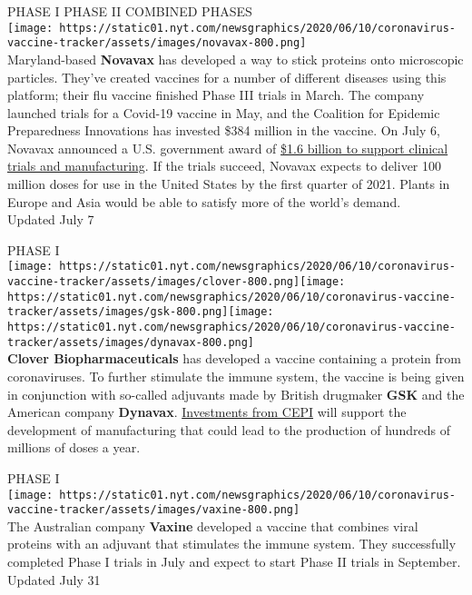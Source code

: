 PHASE I PHASE II COMBINED PHASES\\
\texttt{[image: https://static01.nyt.com/newsgraphics/2020/06/10/coronavirus-vaccine-tracker/assets/images/novavax-800.png]}\\
Maryland-based \textbf{Novavax} has developed a way to stick proteins
onto microscopic particles. They've created vaccines for a number of
different diseases using this platform; their flu vaccine finished Phase
III trials in March. The company launched trials for a Covid-19 vaccine
in May, and the Coalition for Epidemic Preparedness Innovations has
invested \$384 million in the vaccine. On July 6, Novavax announced a
U.S. government award of
\href{https://www.nytimes.com/2020/07/07/health/novavax-coronavirus-vaccine-warp-speed.html}{\$1.6
billion to support clinical trials and manufacturing}. If the trials
succeed, Novavax expects to deliver 100 million doses for use in the
United States by the first quarter of 2021. Plants in Europe and Asia
would be able to satisfy more of the world's demand.\\
Updated July 7

PHASE I\\
\texttt{[image: https://static01.nyt.com/newsgraphics/2020/06/10/coronavirus-vaccine-tracker/assets/images/clover-800.png]}\texttt{[image: https://static01.nyt.com/newsgraphics/2020/06/10/coronavirus-vaccine-tracker/assets/images/gsk-800.png]}\texttt{[image: https://static01.nyt.com/newsgraphics/2020/06/10/coronavirus-vaccine-tracker/assets/images/dynavax-800.png]}\\
\textbf{Clover Biopharmaceuticals} has developed a vaccine containing a
protein from coronaviruses. To further stimulate the immune system, the
vaccine is being given in conjunction with so-called adjuvants made by
British drugmaker \textbf{GSK} and the American company
\textbf{Dynavax}.
\href{https://cepi.net/news_cepi/cepi-expands-partnership-with-clover-biopharmaceuticals-to-rapidly-advance-development-and-manufacture-of-covid-19-vaccine-candidate/}{Investments
from CEPI} will support the development of manufacturing that could lead
to the production of hundreds of millions of doses a year.

PHASE I\\
\texttt{[image: https://static01.nyt.com/newsgraphics/2020/06/10/coronavirus-vaccine-tracker/assets/images/vaxine-800.png]}\\
The Australian company \textbf{Vaxine} developed a vaccine that combines
viral proteins with an adjuvant that stimulates the immune system. They
successfully completed Phase I trials in July and expect to start Phase
II trials in September.\\
Updated July 31

